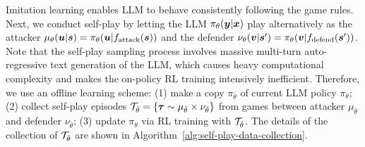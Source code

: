 \documentclass{article}
\theoremstyle{plain}
\theoremstyle{definition}
\theoremstyle{remark}
\begin{document}
Imitation learning enables LLM to behave consistently following the game rules. Next, we conduct self-play by letting the LLM $\pi_\theta({\bm{y}}|{\bm{x}})$ play alternatively as the attacker  $\mu_\theta({\bm{u}} | {\bm{s}}) = \pi_\theta({\bm{u}} | f_\text{attack}({\bm{s}}))$ and the defender $\nu_\theta({\bm{v}} |{\bm{s}}') = \pi_\theta({\bm{v}}| f_\text{defend}({\bm{s}}'))$. 
Note that the self-play sampling process involves massive multi-turn auto-regressive text generation of the LLM, which causes heavy computational complexity and makes the on-policy RL training intensively inefficient. Therefore, we use an offline learning scheme: (1) make a copy $\pi_{\bar{\theta}}$ of current LLM policy $\pi_\theta$; (2) collect self-play episodes ${\mathcal{T}}_{\bar{\theta}} = \{\bm{\tau} \sim \mu_{\bar{\theta}} \times \nu_{\bar{\theta}} \}$ from games between attacker $\mu_{\bar{\theta}}$ and defender $\nu_{\bar{\theta}}$; (3) update $\pi_\theta$ via RL training with ${\mathcal{T}}_{\bar{\theta}}$.
%
%
The details of the collection of ${\mathcal{T}}_{\bar{\theta}}$ are shown in Algorithm~\ref{alg:self-play-data-collection}. %
\end{document}
